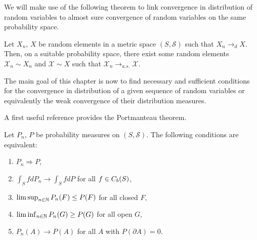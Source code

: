 We will make use of the following theorem to link convergence in distribution of random variables to almost sure convergence of random variables on the same probability space.
\begin{theorem}
	Let $X_n$, $X$ be random elements in a metric space $(S, \mathcal{S})$ such that $X_n \rightarrow_d X$. 
	Then, on a suitable probability space, there exist some random elements $\mathcal{X}_n \sim X_n$ and $\mathcal{X} \sim X$
	such that $\mathcal{X}_n \rightarrow_{a.s.} \mathcal{X}$.
\end{theorem}

The main goal of this chapter is now to find necessary and sufficient conditions
for the convergence in distribution of a given sequence of random variables 
or equivalently the weak convergence of their distribution measures.

A first useful reference provides the Portmanteau theorem.
\begin{theorem} \label{T: portmanteau weak}
	Let $P_n$, $P$ be probability measures on $(S, \mathcal{S})$.
	The following conditions are equivalent:
	\begin{enumerate}
		\item $P_n \Rightarrow P$,
		\item $\int_S fdP_n \rightarrow \int_S fdP$ for all $f \in C_b(S)$,
		\item $\limsup_{n \in \mathbb{N}}P_n(F) \leq P(F)$ for all closed $F$,
		\item $\liminf_{n \in \mathbb{N}}P_n(G) \geq P(G)$ for all open $G$,
		\item $P_n(A) \rightarrow P(A)$ for all $A$ with $P(\partial A) = 0$.
	\end{enumerate}
\end{theorem}

